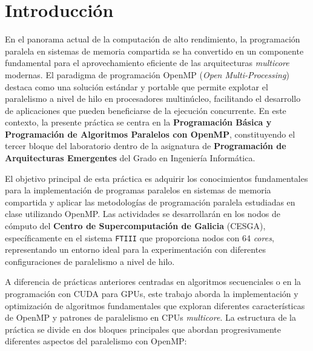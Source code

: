\chapter{Introducción}

En el panorama actual de la computación de alto rendimiento, la programación paralela en sistemas de memoria compartida se ha convertido en un componente fundamental para el aprovechamiento eficiente de las arquitecturas \textit{multicore} modernas. El paradigma de programación OpenMP (\textit{Open Multi-Processing}) destaca como una solución estándar y portable que permite explotar el paralelismo a nivel de hilo en procesadores multinúcleo, facilitando el desarrollo de aplicaciones que pueden beneficiarse de la ejecución concurrente. En este contexto, la presente práctica se centra en la \textbf{Programación Básica y Programación de Algoritmos Paralelos con OpenMP}, constituyendo el tercer bloque del laboratorio dentro de la asignatura de \textbf{Programación de Arquitecturas Emergentes} del Grado en Ingeniería Informática.

El objetivo principal de esta práctica es adquirir los conocimientos fundamentales para la implementación de programas paralelos en sistemas de memoria compartida y aplicar las metodologías de programación paralela estudiadas en clase utilizando OpenMP. Las actividades se desarrollarán en los nodos de cómputo del \textbf{Centro de Supercomputación de Galicia} (CESGA), específicamente en el sistema \texttt{FTIII} que proporciona nodos con 64 \textit{cores}, representando un entorno ideal para la experimentación con diferentes configuraciones de paralelismo a nivel de hilo.

A diferencia de prácticas anteriores centradas en algoritmos secuenciales o en la programación con CUDA para GPUs, este trabajo aborda la implementación y optimización de algoritmos fundamentales que exploran diferentes características de OpenMP y patrones de paralelismo en CPUs \textit{multicore}. La estructura de la práctica se divide en dos bloques principales que abordan progresivamente diferentes aspectos del paralelismo con OpenMP:

